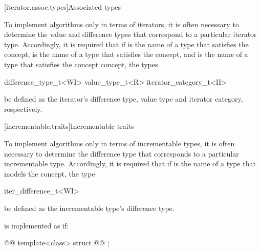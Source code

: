 \begin{addedblock}
[iterator.assoc.types]{Associated types}

{\color{oldclr}
\pnum
To implement algorithms only in terms of iterators, it is often necessary to
determine the value and
difference types that correspond to a particular iterator type.
Accordingly, it is required that if
 is the name of a type that
satisfies the 
concept,
 is the name of a type that
satisfies the  concept, and
 is the name of a type that satisfies the
 concept concept, the types

\begin{codeblock}
difference_type_t<WI>
value_type_t<R>
iterator_category_t<II>
\end{codeblock}

be defined as the iterator's difference type, value type
and iterator category, respectively.
} %

[incrementable.traits]{Incrementable traits}

{\color{newclr}
\pnum
To implement algorithms only in terms of incrementable types, it is often necessary to
determine the difference type that corresponds to a particular incrementable type.
Accordingly, it is required that if  is the name of a type that
models the  concept,
the type

\begin{codeblock}
iter_difference_t<WI>
\end{codeblock}

be defined as the incrementable type's difference type.
} %

\pnum
{} is implemented as if:

%
%
\begin{codeblock}
@@
  template<class> struct @@ { };


\end{codeblock}
\end{addedblock}
